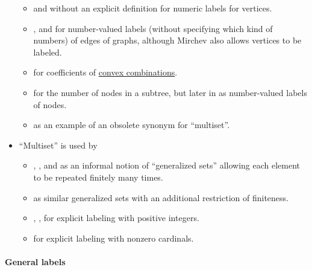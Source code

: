 \begin{remark}
\begin{itemize}
\begin{itemize}
      \item {} and  without an explicit definition for numeric labels for vertices.

      \item {},  and  for number-valued labels (without specifying which kind of numbers) of edges of graphs, although Mirchev also allows vertices to be labeled.

      \item {} for coefficients of \hyperref[def:convex_hull]{convex combinations}.

      \item {} for the number of nodes in a subtree, but later in  as number-valued labels of nodes.

      \item {} as an example of an obsolete synonym for \enquote{multiset}.
    \end{itemize}

    \item \enquote{Multiset} is used by
    \begin{itemize}
      \item {}, ,  and  as an informal notion of \enquote{generalized sets} allowing each element to be repeated finitely many times.

      \item {} as similar generalized sets with an additional restriction of finiteness.

      \item {}, ,   for explicit labeling with positive integers.

      \item {} for explicit labeling with nonzero cardinals.
    \end{itemize}
  \end{itemize}
\end{remark}

\paragraph{General labels}

